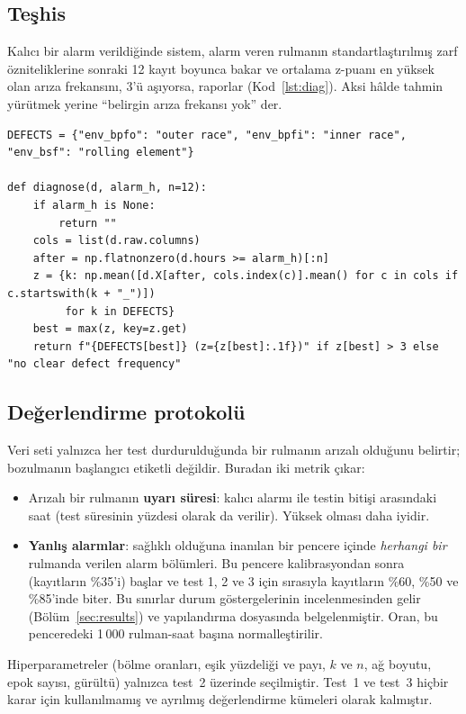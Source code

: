 \documentclass[11pt]{article}
\begin{document}
\subsection{Teşhis}
Kalıcı bir alarm verildiğinde sistem, alarm veren rulmanın standartlaştırılmış zarf özniteliklerine
sonraki 12 kayıt boyunca bakar ve ortalama z-puanı en yüksek olan arıza frekansını, 3'ü aşıyorsa,
raporlar (Kod~\ref{lst:diag}). Aksi hâlde tahmin yürütmek yerine ``belirgin arıza frekansı yok'' der.

\begin{lstlisting}[caption={Zarfa dayalı teşhis (\code{scripts/run\_experiment.py}'den alıntı).},label=lst:diag]
DEFECTS = {"env_bpfo": "outer race", "env_bpfi": "inner race", "env_bsf": "rolling element"}

def diagnose(d, alarm_h, n=12):
    if alarm_h is None:
        return ""
    cols = list(d.raw.columns)
    after = np.flatnonzero(d.hours >= alarm_h)[:n]
    z = {k: np.mean([d.X[after, cols.index(c)].mean() for c in cols if c.startswith(k + "_")])
         for k in DEFECTS}
    best = max(z, key=z.get)
    return f"{DEFECTS[best]} (z={z[best]:.1f})" if z[best] > 3 else "no clear defect frequency"
\end{lstlisting}

\subsection{Değerlendirme protokolü}
Veri seti yalnızca her test durdurulduğunda bir rulmanın arızalı olduğunu belirtir; bozulmanın
başlangıcı etiketli değildir. Buradan iki metrik çıkar:
\begin{itemize}
  \item Arızalı bir rulmanın \textbf{uyarı süresi}: kalıcı alarmı ile testin bitişi arasındaki saat
        (test süresinin yüzdesi olarak da verilir). Yüksek olması daha iyidir.
  \item \textbf{Yanlış alarmlar}: sağlıklı olduğuna inanılan bir pencere içinde \emph{herhangi bir}
        rulmanda verilen alarm bölümleri. Bu pencere kalibrasyondan sonra (kayıtların \%35'i) başlar ve
        test 1, 2 ve 3 için sırasıyla kayıtların \%60, \%50 ve \%85'inde biter. Bu sınırlar durum
        göstergelerinin incelenmesinden gelir (Bölüm~\ref{sec:results}) ve yapılandırma dosyasında
        belgelenmiştir. Oran, bu penceredeki 1\,000 rulman-saat başına normalleştirilir.
\end{itemize}
Hiperparametreler (bölme oranları, eşik yüzdeliği ve payı, $k$ ve $n$, ağ boyutu, epok sayısı, gürültü)
yalnızca test~2 üzerinde seçilmiştir. Test~1 ve test~3 hiçbir karar için kullanılmamış ve ayrılmış
değerlendirme kümeleri olarak kalmıştır.
\end{document}
